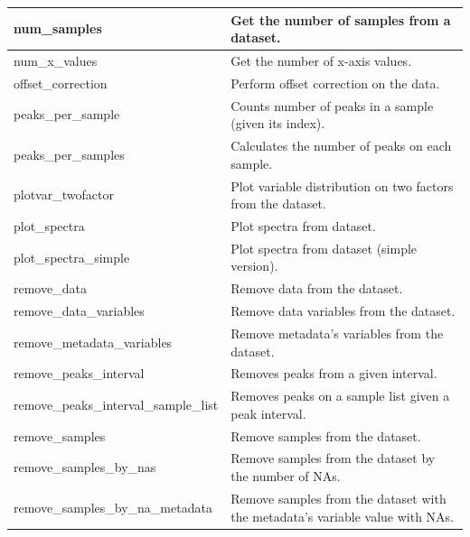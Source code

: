 \begin{scriptsize}
\begin{longtable}{|m{4.3cm}|m{11cm}|}
		\hline
		num\_samples & Get the number of samples from a dataset. \\
		
		\hline
		num\_x\_values & Get the number of x-axis values. \\
		
		\hline
		offset\_correction & Perform offset correction on the data. \\
		
		\hline
		peaks\_per\_sample & Counts number of peaks in a sample (given its index). \\
		
		\hline
		peaks\_per\_samples & Calculates the number of peaks on each sample. \\
		
		\hline
		plotvar\_twofactor & Plot variable distribution on two factors from the dataset. \\
		
		\hline
		plot\_spectra & Plot spectra from dataset. \\
		
		\hline
		plot\_spectra\_simple & Plot spectra from dataset (simple version). \\
		
		\hline
		remove\_data & Remove data from the dataset. \\
		
		\hline
		remove\_data\_variables & Remove data variables from the dataset. \\
		
		\hline
		remove\_metadata\_variables & Remove metadata's variables from the dataset. \\
		
		\hline
		remove\_peaks\_interval & Removes peaks from a given interval. \\
		
		\hline
		remove\_peaks\_interval\_sample\_list & Removes peaks on a sample list given a peak interval. \\
		
		\hline
		remove\_samples & Remove samples from the dataset. \\
		
		\hline
		remove\_samples\_by\_nas & Remove samples from the dataset by the number of NAs. \\
		
		\hline
		remove\_samples\_by\_na\_metadata & Remove samples from the dataset with the metadata's variable value with NAs. \\
		

\end{longtable}
\end{scriptsize}
